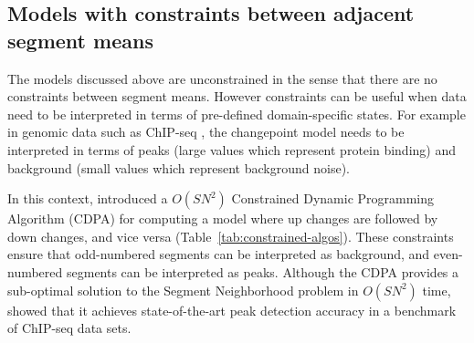 \documentclass[article]{jss}
\begin{document}

\subsection{Models with constraints between adjacent segment means}


The models discussed above are unconstrained in the sense that there
are no constraints between segment means. However constraints can be
useful when data need to be interpreted in terms of pre-defined
domain-specific states. For example in genomic data such as ChIP-seq
\citep{chip-seq}, the changepoint model needs to be interpreted in
terms of peaks (large values which represent protein binding) and
background (small values which represent background noise).

In this context, \citet{HOCKING-PeakSeg} introduced a $O(SN^2)$
Constrained Dynamic Programming Algorithm (CDPA) for computing a model
where up changes are followed by down changes, and vice versa
(Table~\ref{tab:constrained-algos}). These constraints ensure that
odd-numbered segments can be interpreted as background, and
even-numbered segments can be interpreted as peaks. Although the CDPA
provides a sub-optimal solution to the Segment Neighborhood problem in
$O(SN^2)$ time, \citet{HOCKING2016-chipseq} showed that it achieves
state-of-the-art peak detection accuracy in a benchmark of
ChIP-seq data sets. 

\end{document}
